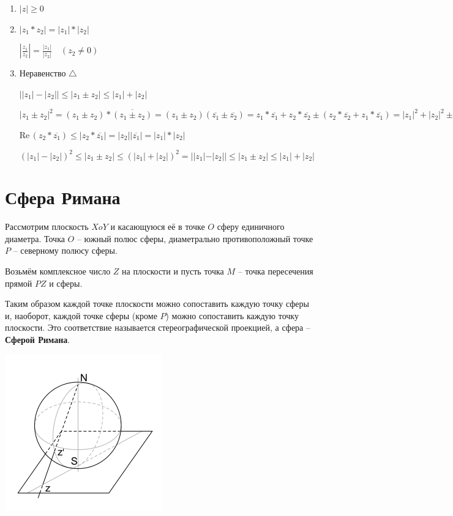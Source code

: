 \documentclass[a4paper,oneside]{article}
\newcommand{\real}{\mathrm{Re} \,}
\begin{document}
\begin{enumerate}
    \item $|z| \ge 0$
    \item $|z_1 * z_2| = |z_1| * |z_2|$
    
    $\left| \frac{z_1}{z_2} \right| = \frac{|z_1|}{|z_2|} \quad (z_2 \ne 0)$

    \item Неравенство $\triangle$
    
    $\left| |z_1| - |z_2| \right| \le |z_1 \pm z_2| \le |z_1| + |z_2|$
    
    $|z_1 \pm z_2|^2 = (z_1 \pm z_2) * \overline{(z_1 \pm z_2)} 
    = (z_1 \pm z_2) (\overline{z_1} \pm \overline{z_2})
    = z_1 * \overline{z_1} + z_2 * \overline{z_2} \pm (z_2 * \overline{z_2} + z_1 * \overline{z_1})
    = |z_1|^2+|z_2|^2 \pm 2 \real (z_2 * \overline{z_1})$

    $\real (z_2 * \overline{z_1}) \le |z_2 * \overline{z_1}| = |z_2| |\overline{z_1}| = |z_1| * |z_2|$

    $(|z_1|-|z_2|)^2 \le |z_1 \pm z_2| \le (|z_1| + |z_2|)^2
    = | |z_1| - |z_2| | \le |z_1 \pm z_2| \le |z_1| + |z_2|$
\end{enumerate}

\section{Сфера Римана}

Рассмотрим плоскость $XoY$ и касающуюся её в точке $O$ сферу
единичного диаметра. Точка $O$ -- южный полюс сферы, диаметрально
противоположный точке $P$ -- северному полюсу сферы. 

Возьмём комплексное число $Z$ на плоскости и пусть точка $M$ --
точка пересечения прямой $PZ$ и сферы.

Таким образом каждой точке плоскости можно сопоставить каждую точку 
сферы и, наоборот, каждой точке сферы (кроме $P$) можно сопоставить
каждую точку плоскости. Это соответствие называется стереографической
проекцией, а сфера -- \textbf{Сферой Римана}. 

\includegraphics[scale=0.5]{riemannsphere}
\end{document}
